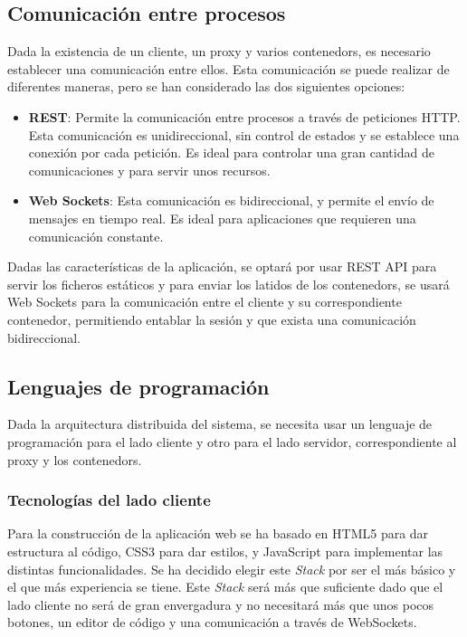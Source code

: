 \subsection{Comunicación entre procesos} \label{subsec:comunicacion-procesos}

Dada la existencia de un cliente, un \gls{proxy} y varios \glspl{contenedor}, es necesario establecer una comunicación entre ellos. Esta comunicación se puede realizar de diferentes maneras, pero se han considerado las dos siguientes opciones: 

\begin{itemize}
    \item \textbf{REST}: Permite la comunicación entre \glspl{proceso} a través de peticiones \gls{HTTP}. Esta comunicación es unidireccional, sin control de estados y se establece una conexión por cada petición. Es ideal para controlar una gran cantidad de comunicaciones y para servir unos recursos.
    \item \textbf{Web Sockets}: Esta comunicación es bidireccional, y permite el envío de mensajes en tiempo real. Es ideal para aplicaciones que requieren una comunicación constante.
\end{itemize}

Dadas las características de la aplicación, se optará por usar \gls{REST API} para servir los ficheros estáticos y para enviar los latidos de los \glspl{contenedor}, se usará Web Sockets para la comunicación entre el cliente y su correspondiente \gls{contenedor}, permitiendo entablar la sesión y que exista una comunicación bidireccional.

\subsection{Lenguajes de programación} \label{subsec:programacion}

Dada la arquitectura distribuida del sistema, se necesita usar un lenguaje de programación para el lado cliente y otro para el lado servidor, correspondiente al \gls{proxy} y los \glspl{contenedor}.

\subsubsection{Tecnologías del lado cliente} \label{subsubsec:tecnologias-cliente}

Para la construcción de la aplicación web se ha basado en HTML5 para dar estructura al código, CSS3 para dar estilos, y JavaScript para implementar las distintas funcionalidades. Se ha decidido elegir este \textit{Stack} por ser el más básico y el que más experiencia se tiene. Este \textit{Stack} será más que suficiente dado que el lado cliente no será de gran envergadura y no necesitará más que unos pocos botones, un editor de código y una comunicación a través de WebSockets.


